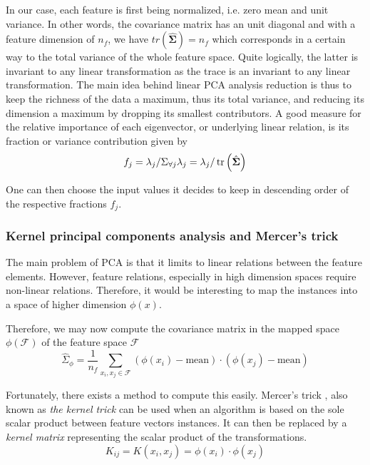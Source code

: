 In our case, each feature is first being normalized, i.e. zero mean and unit variance. In other words, the covariance matrix has an unit diagonal and with a feature dimension of $n_f$, we have $tr(\hat{\mathbf{\Sigma}})=n_f$ which corresponds in a certain way to the total variance of the whole feature space. Quite logically, the latter is invariant to any linear transformation as the trace is an invariant to any linear transformation. The main idea behind linear PCA analysis reduction is thus to keep the richness of the data a maximum, thus its total variance, and reducing its dimension a maximum by dropping its smallest contributors. A good measure for the relative importance of each eigenvector, or underlying linear relation, is its fraction or variance contribution given by
\begin{equation}
f_j = \lambda_j/\Sigma_{\forall j}\lambda_j = \lambda_j/\operatorname{tr}\left(\hat{\mathbf{\Sigma}}\right)
\end{equation}

One can then choose the input values it decides to keep in descending order of the respective fractions $f_j$.

\subsubsection{Kernel principal components analysis and Mercer's trick}
The main problem of PCA is that it limits to linear relations between the feature elements. However, feature relations, especially in high dimension spaces require non-linear relations. Therefore, it would be interesting to map the instances into a space of higher dimension $\phi(x)$.

Therefore, we may now compute the covariance matrix in the mapped space $\phi\left( \mathcal{F} \right)$ of the feature space $\mathcal{F}$
\begin{equation}
    \hat{\Sigma}_{\phi} = \frac{1}{n_f} \sum_{x_i,x_j \in \mathcal{F}} \left( \phi(x_i) - \mathrm{mean} \right) \cdot \left( \phi(x_j) - \mathrm{mean} \right)
\end{equation}

Fortunately, there exists a method to compute this easily. Mercer's trick \cite{Minh2006MercersSmoothing}, also known as \emph{the kernel trick} can be used when an algorithm is based on the sole scalar product between feature vectors instances. It can then be replaced by a \emph{kernel matrix} representing the scalar product of the transformations.
\begin{equation}
    K_{ij} = K(x_i,x_j) = \phi(x_i) \cdot \phi(x_j)
\end{equation}


